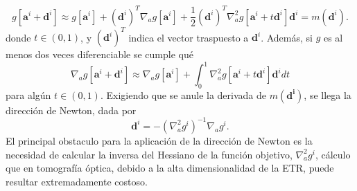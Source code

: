 \begin{equation}
g[\mathbf{a}^i+ \mathbf{d}^i]\approx g[\mathbf{a}^i]+ (\mathbf{d}^i)^T \nabla_a g[\mathbf{a}^i]+\frac{1}{2}(\mathbf{d}^i)^T \nabla_a^2 g[\mathbf{a}^i+t\mathbf{d}^i] \mathbf{d}^i=m(\mathbf{d}^i).
\label{eq:Taylor}
\end{equation}
donde $t \in (0,1)$, y $(\mathbf{d}^i)^T$ indica el vector traspuesto a $\mathbf{d}^i$.
Además, si $g$ es al menos dos veces diferenciable se cumple qué 
\begin{equation}
\nabla_a g[\mathbf{a}^i+ \mathbf{d}^i]\approx \nabla_a g[\mathbf{a}^i]+\int_0^1\nabla_a^2 g[\mathbf{a}^i+t\mathbf{d}^i] \mathbf{d}^idt 
\label{eq:Taylor2}
\end{equation}
para algún $t \in (0,1)$.
Exigiendo que se anule la derivada de $m(\mathbf{d^i})$, se llega la dirección de Newton, dada por
\begin{equation}
\mathbf{d}^i=-(\nabla_a^2 g^i )^{-1} \nabla_a g^i.
\label{eq:direccion}
\end{equation}
El principal obstaculo para la aplicación de la dirección de Newton es la 
necesidad de calcular la inversa del Hessiano de la función objetivo, $\nabla_a^2 g^i$, 
cálculo que en tomografía óptica, debido a la alta dimensionalidad de la ETR, puede 
resultar extremadamente costoso. 

